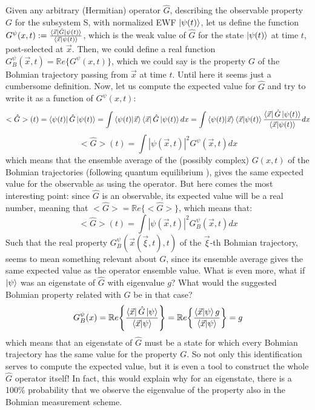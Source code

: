 \documentclass[11pt, a4paper]{article} %
\begin{document}
Given any arbitrary (Hermitian) operator $\hat{G}$, describing the observable property $G$ for the subsystem S, with normalized EWF $\ket{\psi(t)}$, let us define the function $G^{\psi}(x,t):=\frac{\bra{\vec{x}}\hat{G}\ket{\psi(t)}}{\bra{\vec{x}}\ket{\psi(t)}}$, which is the weak value of $\hat{G}$ for the state $\ket{\psi(t)}$ at time $t$, post-selected at $\vec{x}$. Then, we could define a real function $G_B^\psi(\vec{x},t)=\mathbb{R}e\{G^{\psi}(x,t)\}$, which we could say is the property $G$ of the Bohmian trajectory passing from $\vec{x}$ at time $t$. Until here it seems just a cumbersome definition. Now, let us compute the expected value for $\hat{G}$ and try to write it as a function of $G^\psi(x,t)$:
\begin{equation}
<\hat{G}>(t)= \bra{\psi(t)}\hat{G}\ket{\psi(t)}=\int \bra{\psi(t)} \ket{\vec{x}}\bra{\vec{x}}\hat{G}\ket{\psi(t)}dx = \int \bra{\psi(t)}\ket{\vec{x}} \bra{\vec{x}}\ket{\psi(t)}\frac{\bra{\vec{x}}\hat{G}\ket{\psi(t)}}{\bra{\vec{x}}\ket{\psi(t)}}dx
\end{equation}
\begin{equation}
<\hat{G}>(t)= \int |\psi(\vec{x},t)|^2G^\psi(\vec{x},t)dx
\end{equation}
which means that the ensemble average of the (possibly complex) $G(x,t)$ of the Bohmian trajectories (following quantum equilibrium \cite{Absolute}), gives the same expected value for the observable as using the operator. But here comes the most interesting point: since $\hat{G}$ is an observable, its expected value will be a real number, meaning that $<\hat{G}>=\mathbb{R}e\{<\hat{G}>\}$, which means that:
\begin{equation}
<\hat{G}>(t)=\int |\psi(\vec{x},t)|^2G_B^\psi(\vec{x},t)dx
\end{equation}
Such that the real property $G_B^\psi(\vec{x}(\vec{\xi},t),t)$ of the $\vec{\xi}$-th Bohmian trajectory, seems to mean something relevant about $G$, since its ensemble average gives the same expected value as the operator ensemble value. What is even more, what if $\ket{\psi}$ was an eigenstate of $\hat{G}$ with eigenvalue $g$? What would the suggested Bohmian property related with $G$ be in that case?
\begin{equation}
G_B^\psi(x)=\mathbb{R}e\qty{ \frac{\bra{\vec{x}}\hat{G}\ket{\psi}}{\bra{\vec{x}}\ket{\psi}} } = \mathbb{R}e\qty{ \frac{\bra{\vec{x}}\ket{\psi}g}{\bra{\vec{x}}\ket{\psi}} }=g
\end{equation}
which means that an eigenstate of $\hat{G}$ must be a state for which every Bohmian trajectory has the same value for the property $G$. So not only this identification serves to compute the expected value, but it is even a tool to construct the whole $\hat{G}$ operator itself! In fact, this would explain why for an eigenstate, there is a 100\% probability that we observe the eigenvalue of the property also in the Bohmian measurement scheme.
\end{document}
